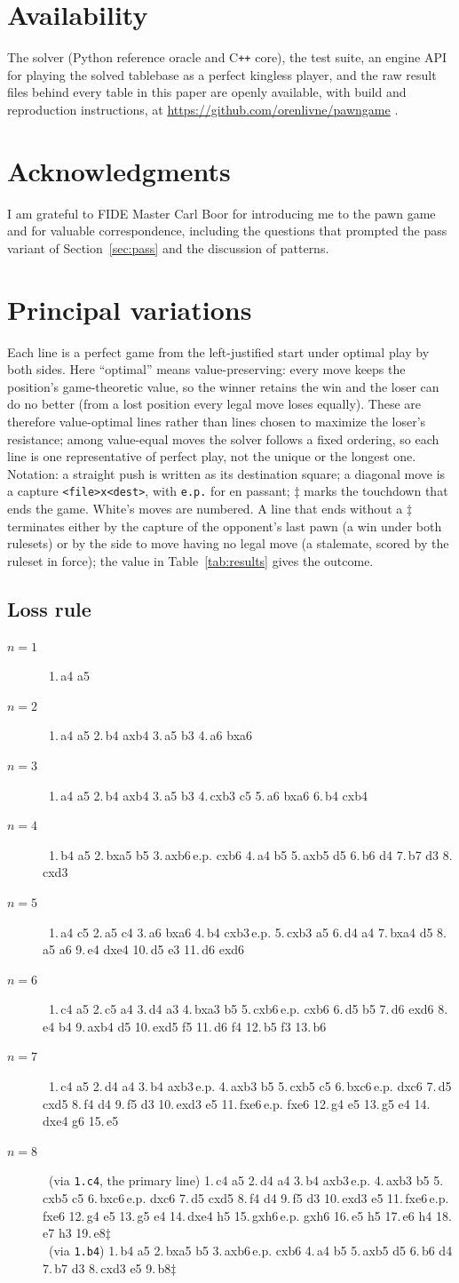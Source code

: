 \documentclass[Afour,sageapa,times]{sagej}
\theoremstyle{plain}
\theoremstyle{definition}
\newcommand{\pvLossI}{1.\,a4 a5}
\newcommand{\pvLossII}{1.\,a4 a5 2.\,b4 axb4 3.\,a5 b3 4.\,a6 bxa6}
\newcommand{\pvLossIII}{1.\,a4 a5 2.\,b4 axb4 3.\,a5 b3 4.\,cxb3 c5 5.\,a6 bxa6 6.\,b4 cxb4}
\newcommand{\pvLossIV}{1.\,b4 a5 2.\,bxa5 b5 3.\,axb6\,e.p. cxb6 4.\,a4 b5 5.\,axb5 d5 6.\,b6 d4 7.\,b7 d3 8.\,cxd3}
\newcommand{\pvLossV}{1.\,a4 c5 2.\,a5 c4 3.\,a6 bxa6 4.\,b4 cxb3\,e.p. 5.\,cxb3 a5 6.\,d4 a4 7.\,bxa4 d5 8.\,a5 a6 9.\,e4 dxe4 10.\,d5 e3 11.\,d6 exd6}
\newcommand{\pvLossVI}{1.\,c4 a5 2.\,c5 a4 3.\,d4 a3 4.\,bxa3 b5 5.\,cxb6\,e.p. cxb6 6.\,d5 b5 7.\,d6 exd6 8.\,e4 b4 9.\,axb4 d5 10.\,exd5 f5 11.\,d6 f4 12.\,b5 f3 13.\,b6}
\newcommand{\pvLossVII}{1.\,c4 a5 2.\,d4 a4 3.\,b4 axb3\,e.p. 4.\,axb3 b5 5.\,cxb5 c5 6.\,bxc6\,e.p. dxc6 7.\,d5 cxd5 8.\,f4 d4 9.\,f5 d3 10.\,exd3 e5 11.\,fxe6\,e.p. fxe6 12.\,g4 e5 13.\,g5 e4 14.\,dxe4 g6 15.\,e5}
\newcommand{\pvLossVIIIb}{1.\,b4 a5 2.\,bxa5 b5 3.\,axb6\,e.p. cxb6 4.\,a4 b5 5.\,axb5 d5 6.\,b6 d4 7.\,b7 d3 8.\,cxd3 e5 9.\,b8$\ddagger$}
\newcommand{\pvLossVIIIc}{1.\,c4 a5 2.\,d4 a4 3.\,b4 axb3\,e.p. 4.\,axb3 b5 5.\,cxb5 c5 6.\,bxc6\,e.p. dxc6 7.\,d5 cxd5 8.\,f4 d4 9.\,f5 d3 10.\,exd3 e5 11.\,fxe6\,e.p. fxe6 12.\,g4 e5 13.\,g5 e4 14.\,dxe4 h5 15.\,gxh6\,e.p. gxh6 16.\,e5 h5 17.\,e6 h4 18.\,e7 h3 19.\,e8$\ddagger$}
\begin{document}
\section*{Availability}

The solver (Python reference oracle and C\texttt{++} core), the test suite, an
engine API for playing the solved tablebase as a perfect kingless player, and the
raw result files behind every table in this paper are openly available, with build
and reproduction instructions, at \url{https://github.com/orenlivne/pawngame}
\cite{reprorepo}.

\section*{Acknowledgments}

I am grateful to FIDE Master Carl Boor for introducing me to the pawn game and for
valuable correspondence, including the questions that prompted the pass variant of
Section~\ref{sec:pass} and the discussion of patterns.

\appendix
\section{Principal variations}\label{app:pv}

Each line is a perfect game from the left-justified start under optimal play by both
sides. Here ``optimal'' means value-preserving: every move keeps the position's
game-theoretic value, so the winner retains the win and the loser can do no better
(from a lost position every legal move loses equally). These are therefore
value-optimal lines rather than lines chosen to maximize the loser's resistance;
among value-equal moves the solver follows a fixed ordering, so each line is one
representative of perfect play, not the unique or the longest one. Notation: a straight push is written as its destination square; a
diagonal move is a capture \texttt{<file>x<dest>}, with \texttt{e.p.} for en
passant; $\ddagger$ marks the touchdown that ends the game. White's moves are
numbered. A line that ends without a $\ddagger$ terminates either by the capture of
the opponent's last pawn (a win under both rulesets) or by the side to move having
no legal move (a stalemate, scored by the ruleset in force); the value in
Table~\ref{tab:results} gives the outcome.

\newcommand{\pvitem}[2]{\item[$n=#1$]\ #2}

\subsection*{Loss rule}
\begin{description}
\pvitem{1}{\pvLossI}
\pvitem{2}{\pvLossII}
\pvitem{3}{\pvLossIII}
\pvitem{4}{\pvLossIV}
\pvitem{5}{\pvLossV}
\pvitem{6}{\pvLossVI}
\pvitem{7}{\pvLossVII}
\item[$n=8$]\ (via \texttt{1.c4}, the primary line) \pvLossVIIIc\\
\phantom{$n=8$}\ (via \texttt{1.b4}) \pvLossVIIIb
\end{description}
\end{document}
